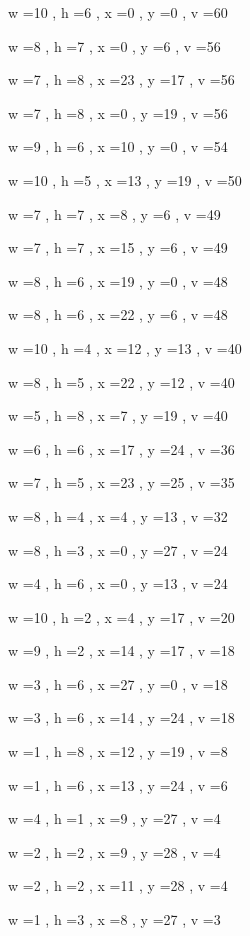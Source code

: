 \documentclass[11pt]{article}
\begin{document}
w =10 , h =6 , x =0 , y =0 , v =60
\par
w =8 , h =7 , x =0 , y =6 , v =56
\par
w =7 , h =8 , x =23 , y =17 , v =56
\par
w =7 , h =8 , x =0 , y =19 , v =56
\par
w =9 , h =6 , x =10 , y =0 , v =54
\par
w =10 , h =5 , x =13 , y =19 , v =50
\par
w =7 , h =7 , x =8 , y =6 , v =49
\par
w =7 , h =7 , x =15 , y =6 , v =49
\par
w =8 , h =6 , x =19 , y =0 , v =48
\par
w =8 , h =6 , x =22 , y =6 , v =48
\par
w =10 , h =4 , x =12 , y =13 , v =40
\par
w =8 , h =5 , x =22 , y =12 , v =40
\par
w =5 , h =8 , x =7 , y =19 , v =40
\par
w =6 , h =6 , x =17 , y =24 , v =36
\par
w =7 , h =5 , x =23 , y =25 , v =35
\par
w =8 , h =4 , x =4 , y =13 , v =32
\par
w =8 , h =3 , x =0 , y =27 , v =24
\par
w =4 , h =6 , x =0 , y =13 , v =24
\par
w =10 , h =2 , x =4 , y =17 , v =20
\par
w =9 , h =2 , x =14 , y =17 , v =18
\par
w =3 , h =6 , x =27 , y =0 , v =18
\par
w =3 , h =6 , x =14 , y =24 , v =18
\par
w =1 , h =8 , x =12 , y =19 , v =8
\par
w =1 , h =6 , x =13 , y =24 , v =6
\par
w =4 , h =1 , x =9 , y =27 , v =4
\par
w =2 , h =2 , x =9 , y =28 , v =4
\par
w =2 , h =2 , x =11 , y =28 , v =4
\par
w =1 , h =3 , x =8 , y =27 , v =3
\par
\newpage
\end{document}
